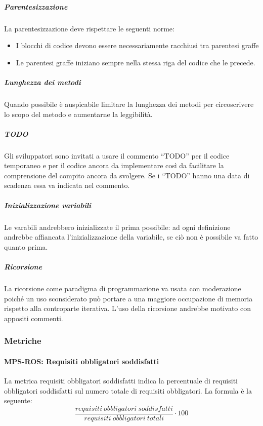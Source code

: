 \documentclass[../../norme-di-progetto.tex]{subfiles}
\begin{document}
\subparagraph{Parentesizzazione}%
\label{subp:parentesizzazione}
La parentesizzazione deve rispettare le seguenti norme:
\begin{itemize}
  \item I blocchi di codice devono essere necessariamente racchiusi tra parentesi graffe
  \item Le parentesi graffe iniziano sempre nella stessa riga del codice che le precede.
\end{itemize}

\subparagraph{Lunghezza dei metodi}%
\label{subp:lunghezza_metodi}
Quando possibile è auspicabile limitare la lunghezza dei metodi per circoscrivere lo scopo del metodo e aumentarne la leggibilità.

\subparagraph{TODO}%
\label{subp:TODO}
Gli sviluppatori sono invitati a usare il commento ``TODO'' per il codice temporaneo e per il codice ancora da implementare così da facilitare la comprensione del compito ancora da svolgere.
Se i ``TODO'' hanno una data di scadenza essa va indicata nel commento.

\subparagraph{Inizializzazione variabili}%
\label{subp:inizializzazione_variabili}
Le varabili andrebbero inizializzate il prima possibile: ad ogni definizione andrebbe affiancata l'inizializzazione della variabile, se ciò non è possibile va fatto quanto prima.

\subparagraph{Ricorsione}%
\label{subp:ricorsione}
La ricorsione come paradigma di programmazione va usata con moderazione poiché un uso sconsiderato può portare a una maggiore occupazione di memoria rispetto alla controparte iterativa.
L'uso della ricorsione andrebbe motivato con appositi commenti.

\subsubsection{Metriche}%
\label{subs:sviluppo/metriche}

\paragraph{MPS-ROS: Requisiti obbligatori soddisfatti}%
\label{par:MPS-ROS_requisiti_obbligatori_soddisfatti}

La metrica requisiti obbligatori soddisfatti indica la percentuale di requisiti obbligatori soddisfatti sul numero totale di requisiti obbligatori. La formula è la seguente:
\[
  \frac{requisiti\ obbligatori\ soddisfatti}{requisiti\ obbligatori\ totali}\cdot 100
\]
\end{document}
